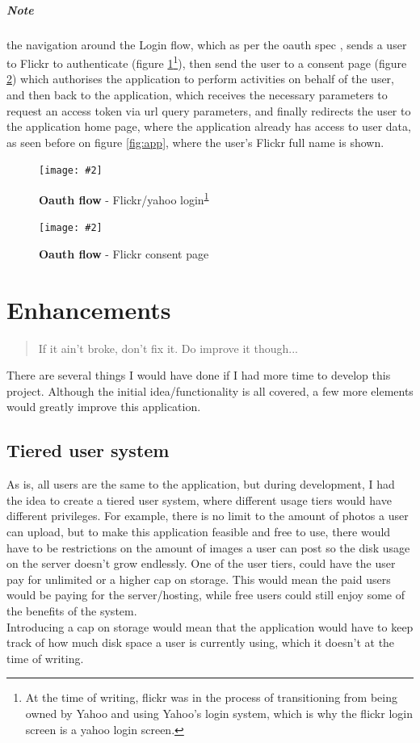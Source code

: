 \documentclass[10pt, a4paper]{article}
\newcommand{\figuremacro}[5]{
\begin{figure}[#1]
\centering
\texttt{[image: \#2]}
\caption[#3]{\textbf{#3}#4}
\label{fig:#2}
\end{figure}
}
\newcommand{\footref}[1]{\textsuperscript{\ref{#1}}}
\begin{document}
        \subparagraph{Note} the navigation around the Login flow, which as per the oauth spec \cite{oauth}, sends a user to Flickr to authenticate (figure \ref{fig:flickr-login}\footnote{\label{ft:yahoo} At the time of writing, flickr was in the process of transitioning from being owned by Yahoo and using Yahoo's login system, which is why the flickr login screen is a yahoo login screen.}), then send the user to a consent page (figure \ref{fig:flickr-consent}) which authorises the application to perform activities on behalf of the user, and then back to the application, which receives the necessary parameters to request an access token via url query parameters, and finally redirects the user to the application home page, where the application already has access to user data, as seen before on figure \ref{fig:app}, where the user's Flickr full name is shown.

        \figuremacro{h}{flickr-login}{Oauth flow}{ - Flickr/yahoo login\footref{ft:yahoo}}{1.0}

        \figuremacro{h}{flickr-consent}{Oauth flow}{ - Flickr consent page}{1.0}

        \section{Enhancements}
        \label{sec:enhancements}
        \blockquote{If it ain't broke, don't fix it. Do improve it though...}

        There are several things I would have done if I had more time to develop this project. Although the initial idea/functionality is all covered, a few more elements would greatly improve this application. 

        \subsection{Tiered user system}	
        As is, all users are the same to the application, but during development, I had the idea to create a tiered user system, where different usage tiers would have different privileges. For example, there is no limit to the amount of photos a user can upload, but to make this application feasible and free to use, there would have to be restrictions on the amount of images a user can post so the disk usage on the server doesn't grow endlessly. One of the user tiers, could have the user pay for unlimited or a higher cap on storage. This would mean the paid users would be paying for the server/hosting, while free users could still enjoy some of the benefits of the system.\\
        Introducing a cap on storage would mean that the application would have to keep track of how much disk space a user is currently using, which it doesn't at the time of writing.
\end{document}
